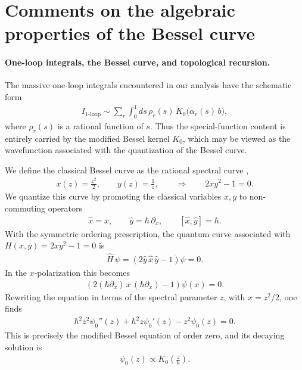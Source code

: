 \section{Comments on the algebraic properties of the Bessel curve}
\paragraph{One-loop integrals, the Bessel curve, and topological recursion.}
The massive one-loop integrals encountered in our analysis have the schematic form
\begin{align}
    I_{\mathrm{1\mbox{-}loop}}
    \sim
    \sum_r \int_0^1 ds\, \rho_r(s)\, K_0\!\big(\alpha_r(s)\,b\big),
\end{align}
where \(\rho_r(s)\) is a rational function of \(s\). Thus the special-function content is entirely carried by the modified Bessel kernel \(K_0\), which may be viewed as the wavefunction associated with the quantization of the Bessel curve.

We define the classical Bessel curve as the rational spectral curve \cite{DoNorbury2018},
\begin{align}
    x(z)=\frac{z^2}{2},
    \qquad
    y(z)=\frac{1}{z},
    \qquad\Longrightarrow\qquad
    2xy^2-1=0.
\end{align}
We quantize this curve by promoting the classical variables \(x,y\) to non-commuting operators
\begin{align}
    \hat x=x,
    \qquad
    \hat y=\hbar\,\partial_x,
    \qquad
    [\hat x,\hat y]=\hbar.
\end{align}
With the symmetric ordering prescription, the quantum curve associated with
\(
H(x,y)=2xy^2-1=0
\)
is
\begin{align}
    \hat H\,\psi=(2\hat y\,\hat x\,\hat y-1)\psi=0.
\end{align}
In the \(x\)-polarization this becomes
\begin{align}
    \left(2(\hbar\partial_x)\,x\,(\hbar\partial_x)-1\right)\psi(x)=0.
\end{align}
Rewriting the equation in terms of the spectral parameter \(z\), with \(x=z^2/2\), one finds
\begin{align}
    \hbar^2 z^2\psi_0''(z)+\hbar^2 z\psi_0'(z)-z^2\psi_0(z)=0.
\end{align}
This is precisely the modified Bessel equation of order zero, and its decaying solution is
\begin{align}
    \psi_0(z)\propto K_0\!\left(\frac{z}{\hbar}\right).
\end{align}

